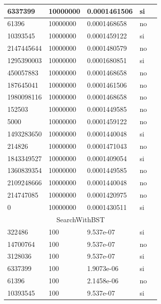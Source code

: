 \documentclass[12pt, fleqn]{article}                             %
\theoremstyle{break}                                            %
\begin{document}
\begin{longtable}{|m{5em}|m{5em}|m{10em}|m{5em}|@{}m{0pt}@{}}
            6337399& 10000000  & 0.0001461506 & si &\\[1em]    \hline
            61396& 10000000  & 0.0001468658 & no &\\[1em]    \hline
            10393545& 10000000  & 0.0001459122 & si &\\[1em]    \hline
            2147445644& 10000000  & 0.0001480579 & no &\\[1em]    \hline
            1295390003& 10000000  & 0.0001680851 & si &\\[1em]    \hline
            450057883& 10000000  & 0.0001468658 & no &\\[1em]    \hline
            187645041& 10000000  & 0.0001461506 & no &\\[1em]    \hline
            1980098116& 10000000  & 0.0001468658 & no &\\[1em]    \hline
            152503& 10000000  & 0.0001449585 & no &\\[1em]    \hline
            5000& 10000000  & 0.0001459122 & no &\\[1em]    \hline
            1493283650& 10000000  & 0.0001440048 & si &\\[1em]    \hline
            214826& 10000000  & 0.0001471043 & no &\\[1em]    \hline
            1843349527& 10000000  & 0.0001409054 & si &\\[1em]    \hline
            1360839354& 10000000  & 0.0001449585 & no &\\[1em]    \hline
            2109248666& 10000000  & 0.0001440048 & no &\\[1em]    \hline
            214747085& 10000000  & 0.0001420975 & no &\\[1em]    \hline
            0& 10000000  & 0.0001430511 & si &\\[1em]    \hline
            \multicolumn{5}{|c|}{SearchWithBST}   \\          \hline
            322486& 100  & 9.537e-07 & si &\\[1em]    \hline
            14700764& 100  & 9.537e-07 & no &\\[1em]    \hline
            3128036& 100  & 9.537e-07 & si &\\[1em]    \hline
            6337399& 100  & 1.9073e-06 & si &\\[1em]    \hline
            61396& 100  & 2.1458e-06 & no &\\[1em]    \hline
            10393545& 100  & 9.537e-07 & si &\\[1em]    \hline

\end{longtable}
\end{document}
